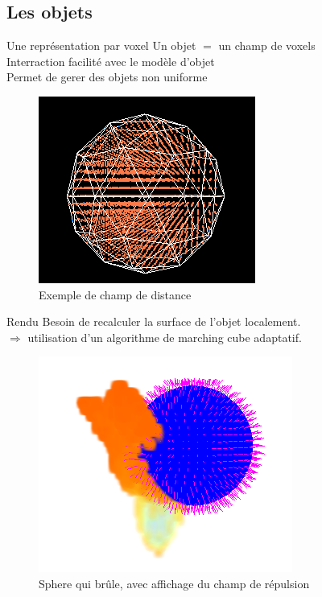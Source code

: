\documentclass{beamer}
\begin{document}
\subsection{Les objets}
\begin{frame}{Une représentation par voxel}
  Un objet $=$ un champ de voxels\\
  Interraction facilité avec le modèle d'objet\\
  Permet de gerer des objets non uniforme\\
  \begin{figure}[!h]
    \centering\includegraphics[scale=0.4]{Distance.png}
    \caption{Exemple de champ de distance}
    \label{Distance}
  \end{figure}
\end{frame}

\begin{frame}{Rendu}
  Besoin de recalculer la surface de l'objet localement.\\ $\Rightarrow$ utilisation d'un algorithme de marching cube
  adaptatif.\\ 
  \begin{figure}[!h]
    \centering\includegraphics[scale=0.4]{Contour.png}
    \caption{Sphere qui brûle, avec affichage du champ de répulsion}
    \label{Distance}
  \end{figure}
\end{frame}
\end{document}

